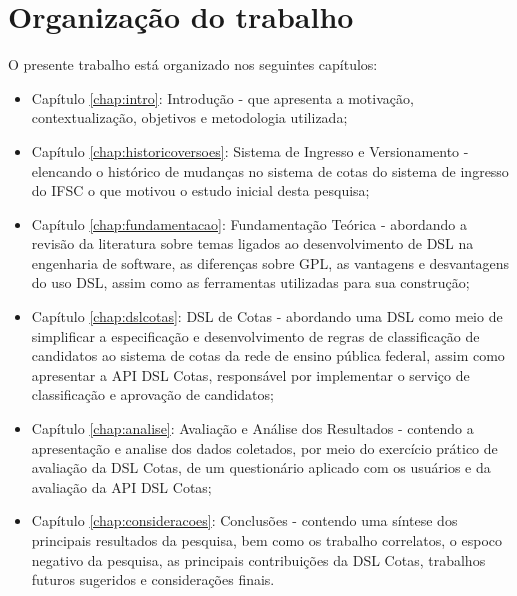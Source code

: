\section{Organização do trabalho}
\label{organizacao}

O presente trabalho está organizado nos seguintes capítulos:

\begin{itemize}
    \item Capítulo \ref{chap:intro}: Introdução - que apresenta a motivação, contextualização, objetivos e metodologia utilizada;
    \item Capítulo \ref{chap:historicoversoes}: Sistema de Ingresso e Versionamento - elencando o histórico de mudanças no sistema de cotas do sistema de ingresso do \gls{IFSC} o que motivou o estudo inicial desta pesquisa;
    \item Capítulo \ref{chap:fundamentacao}: Fundamentação Teórica - abordando a revisão da literatura sobre temas ligados ao desenvolvimento de \gls{DSL} na engenharia de software, as diferenças sobre \gls{GPL}, as vantagens e desvantagens do uso  \gls{DSL}, assim como as ferramentas utilizadas para sua construção;
    \item Capítulo \ref{chap:dslcotas}: DSL de Cotas - abordando uma \gls{DSL} como meio de simplificar a especificação e desenvolvimento de regras de classificação de candidatos ao sistema de cotas da rede de ensino pública federal, assim como apresentar a \gls{API} DSL Cotas, responsável por implementar o serviço de classificação e aprovação de candidatos;
    \item Capítulo \ref{chap:analise}: Avaliação e Análise dos Resultados - contendo a apresentação e analise dos dados coletados, por meio do exercício prático de avaliação da DSL Cotas, de um questionário aplicado com os usuários e da avaliação da
    \gls{API} DSL Cotas;
    \item Capítulo \ref{chap:consideracoes}: Conclusões - contendo uma síntese dos principais resultados da pesquisa, bem como os trabalho correlatos, o espoco negativo da pesquisa, as principais contribuições da DSL Cotas, trabalhos futuros sugeridos e considerações finais.
\end{itemize}
